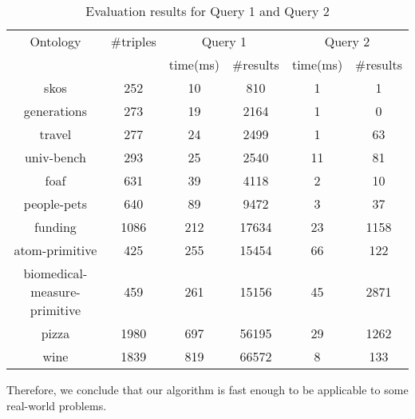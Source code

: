 \begin{table*}[t]
\centering
\caption{Evaluation results for Query 1 and Query 2}
\label{tbl1}

\begin{tabular}{ | c | c | c | c | c | c |}
\hline
Ontology & \#triples & \multicolumn{2}{|c|}{Query 1} & \multicolumn{2}{|c|}{Query 2} \\
\cline{3-6}
& & time(ms) & \#results & time(ms) & \#results \\
\hline 
\hline
skos        & 252 & 10 & 810 & 1 & 1 \\
generations & 273 & 19 & 2164 & 1 & 0 \\
travel      & 277 & 24 & 2499 & 1 & 63 \\
univ-bench  & 293 & 25 & 2540 & 11 & 81 \\
foaf        & 631 & 39 & 4118 & 2 & 10 \\
people-pets & 640 & 89 & 9472 & 3 & 37 \\
funding     & 1086 & 212 & 17634 & 23 & 1158 \\
atom-primitive & 425 & 255 & 15454 & 66 & 122 \\
biomedical-measure-primitive & 459 & 261 & 15156 & 45 & 2871 \\
pizza       & 1980 & 697 & 56195 & 29 & 1262 \\
wine        & 1839 & 819 & 66572 & 8 & 133 \\
\hline
\end{tabular}

\end{table*}

Therefore, we conclude that our algorithm is fast enough to be applicable to some real-world problems.

